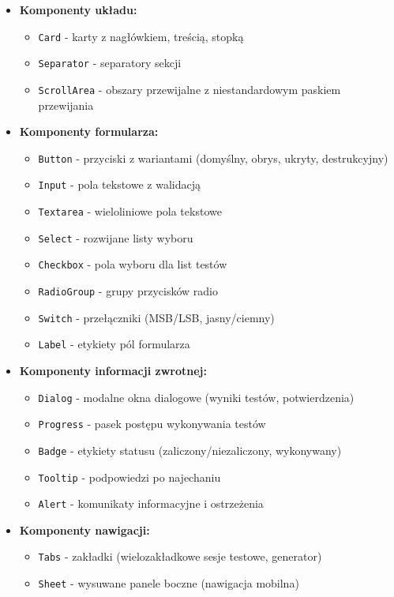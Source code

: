 \documentclass[12pt,a4paper]{article}
\begin{document}
\begin{itemize}
    \item \textbf{Komponenty układu:}
    \begin{itemize}
        \item \texttt{Card} - karty z nagłówkiem, treścią, stopką
        \item \texttt{Separator} - separatory sekcji
        \item \texttt{ScrollArea} - obszary przewijalne z niestandardowym paskiem przewijania
    \end{itemize}
    
    \item \textbf{Komponenty formularza:}
    \begin{itemize}
        \item \texttt{Button} - przyciski z wariantami (domyślny, obrys, ukryty, destrukcyjny)
        \item \texttt{Input} - pola tekstowe z walidacją
        \item \texttt{Textarea} - wieloliniowe pola tekstowe
        \item \texttt{Select} - rozwijane listy wyboru
        \item \texttt{Checkbox} - pola wyboru dla list testów
        \item \texttt{RadioGroup} - grupy przycisków radio
        \item \texttt{Switch} - przełączniki (MSB/LSB, jasny/ciemny)
        \item \texttt{Label} - etykiety pól formularza
    \end{itemize}
    
    \item \textbf{Komponenty informacji zwrotnej:}
    \begin{itemize}
        \item \texttt{Dialog} - modalne okna dialogowe (wyniki testów, potwierdzenia)
        \item \texttt{Progress} - pasek postępu wykonywania testów
        \item \texttt{Badge} - etykiety statusu (zaliczony/niezaliczony, wykonywany)
        \item \texttt{Tooltip} - podpowiedzi po najechaniu
        \item \texttt{Alert} - komunikaty informacyjne i ostrzeżenia
    \end{itemize}
    
    \item \textbf{Komponenty nawigacji:}
    \begin{itemize}
        \item \texttt{Tabs} - zakładki (wielozakładkowe sesje testowe, generator)
        \item \texttt{Sheet} - wysuwane panele boczne (nawigacja mobilna)
    \end{itemize}
    

\end{itemize}
\end{document}
